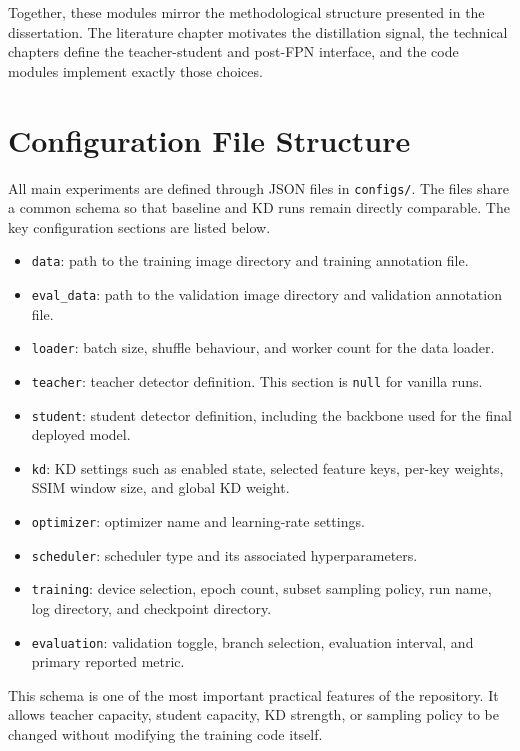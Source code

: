 Together, these modules mirror the methodological structure presented in the dissertation. The literature chapter motivates the distillation signal, the technical chapters define the teacher-student and post-FPN interface, and the code modules implement exactly those choices.

\section{Configuration File Structure}

All main experiments are defined through JSON files in \texttt{configs/}. The files share a common schema so that baseline and KD runs remain directly comparable. The key configuration sections are listed below.

\begin{itemize}
    \item \texttt{data}: path to the training image directory and training annotation file.
    \item \texttt{eval\_data}: path to the validation image directory and validation annotation file.
    \item \texttt{loader}: batch size, shuffle behaviour, and worker count for the data loader.
    \item \texttt{teacher}: teacher detector definition. This section is \texttt{null} for vanilla runs.
    \item \texttt{student}: student detector definition, including the backbone used for the final deployed model.
    \item \texttt{kd}: KD settings such as enabled state, selected feature keys, per-key weights, SSIM window size, and global KD weight.
    \item \texttt{optimizer}: optimizer name and learning-rate settings.
    \item \texttt{scheduler}: scheduler type and its associated hyperparameters.
    \item \texttt{training}: device selection, epoch count, subset sampling policy, run name, log directory, and checkpoint directory.
    \item \texttt{evaluation}: validation toggle, branch selection, evaluation interval, and primary reported metric.
\end{itemize}

This schema is one of the most important practical features of the repository. It allows teacher capacity, student capacity, KD strength, or sampling policy to be changed without modifying the training code itself.


